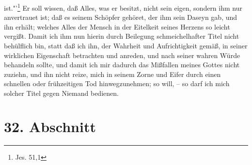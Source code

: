 ist."'\footnote{Jes. 51,1} Er soll wissen, daß Alles, was er besitzt, nicht sein
eigen, sondern ihm nur anvertrauet ist; daß es seinem Schöpfer gehöret, der ihm
sein Daseyn gab, und ihn erhält; welches Alles der Mensch in der Eitelkeit
seines Herzens so leicht vergißt. Damit ich ihm nun hierin durch Beilegung
schmeichelhafter Titel nicht behülflich bin, statt daß ich ihn, der Wahrheit und
Aufrichtigkeit gemäß, in seiner wirklichen Eigenschaft betrachten und anreden,
und nach seiner wahren Würde behandeln sollte, und damit ich mir dadurch das
Mißfallen meines Gottes nicht zuziehn, und ihn nicht reize, mich in seinem Zorne
und Eifer durch einen schnellen oder frühzeitigen Tod hinwegzunehmen; so will,
-- so darf ich mich solcher Titel gegen Niemand bedienen.

\section{32. Abschnitt}

